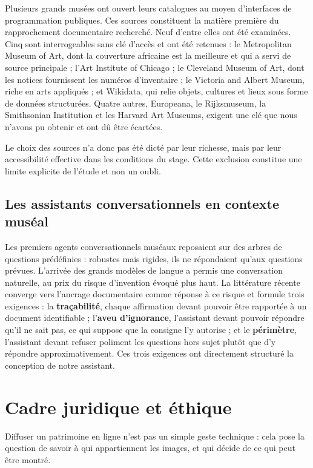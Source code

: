 Plusieurs grands musées ont ouvert leurs catalogues au moyen d'interfaces de
programmation publiques. Ces sources constituent la matière première du
rapprochement documentaire recherché. Neuf d'entre elles ont été examinées.
Cinq sont interrogeables sans clé d'accès et ont été retenues : le Metropolitan
Museum of Art, dont la couverture africaine est la meilleure et qui a servi de
source principale ; l'Art Institute of Chicago ; le Cleveland Museum of Art,
dont les notices fournissent les numéros d'inventaire ; le Victoria and Albert
Museum, riche en arts appliqués ; et Wikidata, qui relie objets, cultures et
lieux sous forme de données structurées. Quatre autres, Europeana, le
Rijksmuseum, la Smithsonian Institution et les Harvard Art Museums, exigent une
clé que nous n'avons pu obtenir et ont dû être écartées.

Le choix des sources n'a donc pas été dicté par leur richesse, mais par leur
accessibilité effective dans les conditions du stage. Cette exclusion constitue
une limite explicite de l'étude et non un oubli.

\subsection{Les assistants conversationnels en contexte muséal}

Les premiers agents conversationnels muséaux reposaient sur des arbres de
questions prédéfinies : robustes mais rigides, ils ne répondaient qu'aux
questions prévues. L'arrivée des grands modèles de langue a permis une
conversation naturelle, au prix du risque d'invention évoqué plus haut. La
littérature récente converge vers l'ancrage documentaire comme réponse à ce
risque et formule trois exigences : la \textbf{traçabilité}, chaque affirmation
devant pouvoir être rapportée à un document identifiable ; l'\textbf{aveu
d'ignorance}, l'assistant devant pouvoir répondre qu'il ne sait pas, ce qui
suppose que la consigne l'y autorise ; et le \textbf{périmètre}, l'assistant
devant refuser poliment les questions hors sujet plutôt que d'y répondre
approximativement. Ces trois exigences ont directement structuré la conception
de notre assistant.
\section{Cadre juridique et éthique}
\label{sec:juridique}

Diffuser un patrimoine en ligne n'est pas un simple geste technique : cela pose
la question de savoir à qui appartiennent les images, et qui décide de ce qui
peut être montré.

